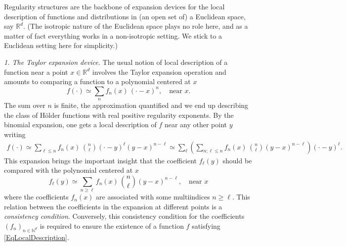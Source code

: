 \documentclass[10pt, reqno]{amsart}
\numberwithin{subsection}{section}
\numberwithin{subsubsection}{subsection}
\numberwithin{equation}{section} %
\theoremstyle{mystyle}
\theoremstyle{mystyle2}
\theoremstyle{mystyle3}
\newcommand{\ssk}{\smallskip}
\newcommand\bbN{\mathbb{N}}
\newcommand\bbR{\mathbb{R}}
\begin{document}
Regularity structures are the backbone of expansion devices for the local description of functions and distributions in (an open set of) a Euclidean space, say $\bbR^d$. (The isotropic nature of the Euclidean space plays no role here, and as a matter of fact everything works in a non-isotropic setting. We stick to a Euclidean setting here for simplicity.)

\ssk

{\it 1. The Taylor expansion device.} The usual notion of local description of a function near a point $x\in\bbR^d$ involves the Taylor expansion operation and amounts to comparing a function to a polynomial centered at $x$
\begin{equation}   \label{EqLocalDescription}
f(\cdot) \simeq \sum_n f_n(x)\,(\cdot-x)^n, \quad \textrm{near }x.
\end{equation}
The sum over $n$ is finite, the approximation quantified and we end up describing the class of H\"older functions with real positive regularity exponents. By the binomial expansion, one gets a local description of $f$ near any other point $y$ writing
\begin{equation}   \label{EqDescriptionf}   \begin{split}
f(\cdot) \simeq \sum_{\ell\leq n} f_n(x)\,{n\choose{\ell}} (\cdot-y)^\ell (y-x)^{n-\ell} \simeq \sum_\ell \left(\sum_{n;\ell\leq n} f_n(x)\,{n\choose{\ell}} (y-x)^{n-\ell}\right)(\cdot-y)^\ell.
\end{split}\end{equation}
This expansion brings the important insight that the coefficient $f_\ell(y)$ should be compared with the polynomial centered at $x$
\begin{equation}   \label{EqLocalDescription2}
f_\ell(y) \simeq \sum_{n\geq\ell} f_n(x)\,{n\choose{\ell}}(y-x)^{n-\ell}, \quad \textrm{near }x
\end{equation}
where the coefficients $f_n(x)$ are associated with some multiindices $n\ge\ell$. This relation between the coefficients in the expansion at different points is a {\it consistency condition}. Conversely, this consistency condition for the coefficients $(f_n)_{n\in\bbN^d}$ is required to ensure the existence of a function $f$ satisfying \eqref{EqLocalDescription}.

\ssk
\end{document}
